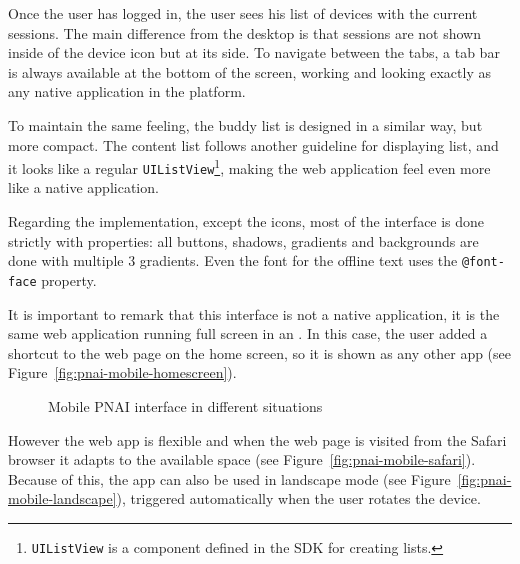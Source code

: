 Once the user has logged in, the user sees his list of devices with the current sessions.
The main difference from the desktop is that sessions are not shown inside of the device icon but at its side.
To navigate between the tabs, a tab bar is always available at the bottom of the screen, working and looking exactly as any native application in the  platform.

To maintain the same feeling, the buddy list is designed in a similar way, but more compact.
The content list follows another  guideline for displaying list, and it looks like a regular \texttt{UIListView}\footnote{\texttt{UIListView} is a component defined in the  SDK for creating lists.}, making the web application feel even more like a native application.

Regarding the implementation, except the icons, most of the interface is done strictly with  properties:
all buttons, shadows, gradients and backgrounds are done with multiple 3 gradients.
Even the font for the offline text uses the \texttt{@font-face} property.

It is important to remark that this interface is not a native application, it is the same web application running full screen in an .
In this case, the user added a shortcut to the  web page on the home screen, so it is shown as any other app (see Figure~\ref{fig:pnai-mobile-homescreen}).

\begin{figure}[htbp]
  \centering
  \caption{Mobile PNAI interface in different situations}
  \label{fig:pnai-mobile-flexible}
\end{figure}

However the web app is flexible and when the web page is visited from the Safari browser it adapts to the available space (see Figure~\ref{fig:pnai-mobile-safari}).
Because of this, the app can also be used in landscape mode (see Figure~\ref{fig:pnai-mobile-landscape}), triggered automatically when the user rotates the device.

